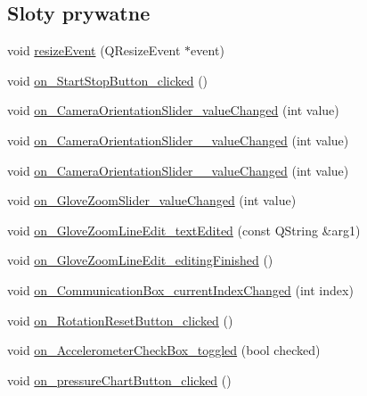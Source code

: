 \subsection*{Sloty prywatne}
\begin{DoxyCompactItemize}
\item 
void \hyperlink{class_main_window_ae12f8f63791595567b6250f8bb002bda}{resize\+Event} (Q\+Resize\+Event $\ast$event)
\item 
void \hyperlink{class_main_window_a0975a297069f8f0cbbd8e7acfc7d85ba}{on\+\_\+\+Start\+Stop\+Button\+\_\+clicked} ()
\item 
void \hyperlink{class_main_window_a08d7ab803fa7f4432ab79dd562547018}{on\+\_\+\+Camera\+Orientation\+Slider\+\_\+value\+Changed} (int value)
\item 
void \hyperlink{class_main_window_aea18c864118db7f1c34def0502538ca0}{on\+\_\+\+Camera\+Orientation\+Slider\+\_\+\_\+value\+Changed} (int value)
\item 
void \hyperlink{class_main_window_a2568066391a65216742f35faa3669230}{on\+\_\+\+Camera\+Orientation\+Slider\+\_\+\_\+value\+Changed} (int value)
\item 
void \hyperlink{class_main_window_a1d8082f8507bb23824db76cca6a047a3}{on\+\_\+\+Glove\+Zoom\+Slider\+\_\+value\+Changed} (int value)
\item 
void \hyperlink{class_main_window_a03fd5ea60139a3735a590af735e9d35f}{on\+\_\+\+Glove\+Zoom\+Line\+Edit\+\_\+text\+Edited} (const Q\+String \&arg1)
\item 
void \hyperlink{class_main_window_a128cb9982a50c3802c80acf388cf5916}{on\+\_\+\+Glove\+Zoom\+Line\+Edit\+\_\+editing\+Finished} ()
\item 
void \hyperlink{class_main_window_a7428e3d91cb9fd09d2cdd1870b69ed60}{on\+\_\+\+Communication\+Box\+\_\+current\+Index\+Changed} (int index)
\item 
void \hyperlink{class_main_window_aa010eef64c7e973afb2c2129538f6cc5}{on\+\_\+\+Rotation\+Reset\+Button\+\_\+clicked} ()
\item 
void \hyperlink{class_main_window_a6b65c205386627f76e10f7eccdcdd290}{on\+\_\+\+Accelerometer\+Check\+Box\+\_\+toggled} (bool checked)
\item 
void \hyperlink{class_main_window_a42c538f11724c7a0e0d86ef357199009}{on\+\_\+pressure\+Chart\+Button\+\_\+clicked} ()
\end{DoxyCompactItemize}
